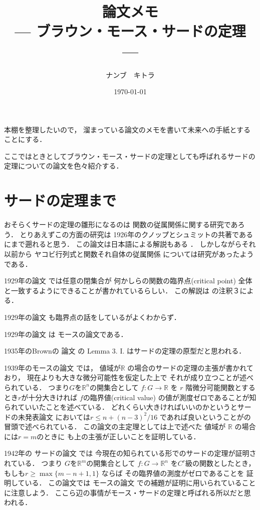 \documentclass[leqno, a4paper, 12pt]{jsarticle}
\title{論文メモ
\large{\\--- ブラウン・モース・サードの定理 ---}
}
\author{ナンブ　キトラ}
\date{\today}
\newcommand{\rr}{\mathbb{R}}
\begin{document}
\maketitle

本棚を整理したいので，
溜まっている論文のメモを書いて未来への手紙とすることにする．


ここではときとしてブラウン・モース・サードの定理としても呼ばれるサードの定理についての論文を色々紹介する．


\section{サードの定理まで}
おそらくサードの定理の雛形になるのは
関数の従属関係に関する研究であろう．
とりあえずこの方面の研究は
1926年のクノップとシュミットの共著である
\cite{knopp1926funktionaldeterminanten}
にまで遡れると思う．
この論文は日本語による解説もある
\cite{1927227}．
しかしながらそれ以前から
ヤコビ行列式と関数それ自体の従属関係
については研究があったようである．

1929年の論文
\cite{ost1929}
では任意の閉集合が
何かしらの関数の臨界点(critical point)
全体と一致するようにできることが書かれているらしい．
この解説は
\cite{MR1545896}の注釈３による．

1929年の論文
\cite{MR1561794}
も臨界点の話をしているがよくわからず．

1929年の論文
\cite{MR1561686}
は
モースの論文である．

1935年のBrownの
論文
\cite{MR1501816}
の
Lemma 3. I. 
はサードの定理の原型だと思われる．

1939年のモースの論文
\cite{MR1503449}
では，
値域が$\rr$
の場合のサードの定理の主張が書かれており，
現在よりも大きな微分可能性を仮定した上で
それが成り立つことが述べられている．
つまり$G$を$\rr^{n}$の開集合として
$f\colon G\to \rr$
を
$r$
階微分可能関数とするとき$r$が十分大きければ
$f$の臨界値(critical value)
の値が測度ゼロであることが知られていいたことを述べている．
どれくらい大きければいいのかというとサードの未発表論文
においては$r\le n+(n-3)^{2}/16$
であれば良いということが\cite{MR1503449}の冒頭で述べられている．
この論文の主定理としては上で述べた
値域が
$\rr$
の場合には$r=m$のときに
も上の主張が正しいことを証明している．

1942年の
サードの論文
\cite{MR0007523}
では
今現在の知られている形でのサードの定理が証明されている．
つまり
$G$を$\rr^{m}$の開集合として
$f\colon G\to \rr^{n}$
を$C^{r}$級の関数としたとき，
もしも$r\ge \max\{m-n+1, 1\}$
ならば
その臨界値の測度がゼロであることを
証明している．
この論文では
モースの論文\cite{MR1503449}
での補題が証明に用いられていることに注意しよう．
ここら辺の事情がモース・サードの定理と呼ばれる所以だと思われる．
\end{document}
